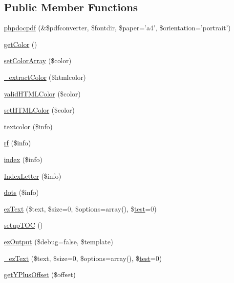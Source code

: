 \subsection*{\-Public \-Member \-Functions}
\begin{DoxyCompactItemize}
\item 
\hyperlink{classphpdocpdf_ab9f1357979bd43bf8aef707fffe14dd7}{phpdocpdf} (\&\$pdfconverter, \$fontdir, \$paper='a4', \$orientation='portrait')
\item 
\hyperlink{classphpdocpdf_aa8642511e4effd1b9ff80c64ff788cfd}{get\-Color} ()
\item 
\hyperlink{classphpdocpdf_af26ae09da89dc7fd3340cf6da72cd275}{set\-Color\-Array} (\$color)
\item 
\hyperlink{classphpdocpdf_a0e5f01d82f76919c8f63e536a83f440d}{\-\_\-extract\-Color} (\$htmlcolor)
\item 
\hyperlink{classphpdocpdf_a16b6f28e6948578cc2cae0c870b7d5c7}{valid\-H\-T\-M\-L\-Color} (\$color)
\item 
\hyperlink{classphpdocpdf_af5bb27ce320133c080ea30205c6376e2}{set\-H\-T\-M\-L\-Color} (\$color)
\item 
\hyperlink{classphpdocpdf_a4b6e1d891b06372b3b4d3470302187bc}{textcolor} (\$info)
\item 
\hyperlink{classphpdocpdf_a4723c9fcd724ef6a587e6394e9199a2e}{rf} (\$info)
\item 
\hyperlink{classphpdocpdf_afe3daf93fa6355350f285e8a72eb62f8}{index} (\$info)
\item 
\hyperlink{classphpdocpdf_a14ebd07cd0b21b0fbfadddc01be69463}{\-Index\-Letter} (\$info)
\item 
\hyperlink{classphpdocpdf_a0c88aa36df96199ebbc5b4424a85841f}{dots} (\$info)
\item 
\hyperlink{classphpdocpdf_a70844d79499d5d80f3dfb0c0b0e9d3c2}{ez\-Text} (\$text, \$size=0, \$options=array(), \$\hyperlink{classtest}{test}=0)
\item 
\hyperlink{classphpdocpdf_a3eb4a60691b570d92d299bc7a638309d}{setup\-T\-O\-C} ()
\item 
\hyperlink{classphpdocpdf_aa69a563b758c790a376c270fdc6bbd79}{ez\-Output} (\$debug=false, \$template)
\item 
\hyperlink{classphpdocpdf_a7465947a771977ffbb96f00632b07fb7}{\-\_\-ez\-Text} (\$text, \$size=0, \$options=array(), \$\hyperlink{classtest}{test}=0)
\item 
\hyperlink{classphpdocpdf_ac9594568293b50c45c31d8029c4aa17a}{get\-Y\-Plus\-Offset} (\$offset)
\item 

\end{DoxyCompactItemize}
